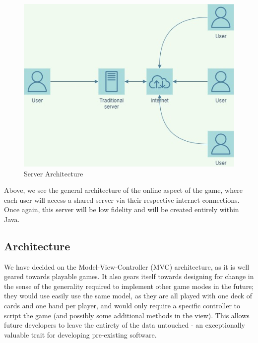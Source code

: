 \documentclass[12pt, titlepage]{article}
\begin{document}
    \begin{figure}
        \includegraphics[width=15cm]{implementation_environment (1).jpg}
        \caption{Server Architecture}
    \end{figure}

\bigskip

Above, we see the general architecture of the online aspect of the game, where each user will access a shared server via their respective internet connections. Once again, this server will be low fidelity and will be created entirely within Java. 

\subsection{Architecture}

We have decided on the Model-View-Controller (MVC) architecture, as it is well geared towards playable games. It also gears itself towards designing for change in the sense of the generality required to implement other game modes in the future; they would use easily use the same model, as they are all played with one deck of cards and one hand per player, and would only require a specific controller to script the game (and possibly some additional methods in the view). This allows future developers to leave the entirety of the data untouched - an exceptionally valuable trait for developing pre-existing software. 
\end{document}
